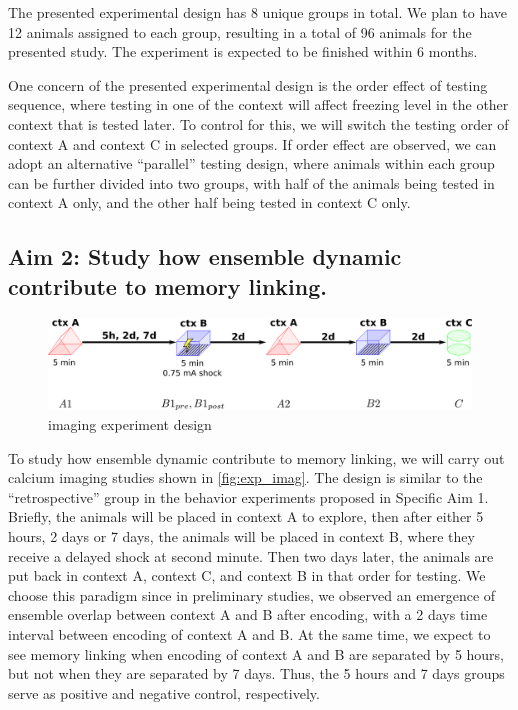 \documentclass[master.tex]{subfiles}
\begin{document}
The presented experimental design has 8 unique groups in total. We plan to have
12 animals assigned to each group, resulting in a total of 96 animals for the
presented study. The experiment is expected to be finished within 6 months.

One concern of the presented experimental design is the order effect of testing
sequence, where testing in one of the context will affect freezing level in the
other context that is tested later. To control for this, we will switch the
testing order of context A and context C in selected groups. If order effect are
observed, we can adopt an alternative ``parallel'' testing design, where animals
within each group can be further divided into two groups, with half of the
animals being tested in context A only, and the other half being tested in
context C only.

\subsection*{Aim 2: Study how ensemble dynamic contribute to memory linking.}

\begin{figure}[!hbt]
  \centering \includegraphics[scale = .135]{Figures/exp_imag.pdf}
  \caption{\footnotesize imaging experiment design}
  \label{fig:exp_imag}
\end{figure}

To study how ensemble dynamic contribute to memory linking, we will carry out
calcium imaging studies shown in \autoref{fig:exp_imag}. The design is similar
to the ``retrospective'' group in the behavior experiments proposed in Specific
Aim 1. Briefly, the animals will be placed in context A to explore, then after
either 5 hours, 2 days or 7 days, the animals will be placed in context B, where
they receive a delayed shock at second minute. Then two days later, the animals
are put back in context A, context C, and context B in that order for testing.
We choose this paradigm since in preliminary studies, we observed an emergence
of ensemble overlap between context A and B after encoding, with a 2 days time
interval between encoding of context A and B. At the same time, we expect to see
memory linking when encoding of context A and B are separated by 5 hours, but
not when they are separated by 7 days. Thus, the 5 hours and 7 days groups serve
as positive and negative control, respectively.
\end{document}
